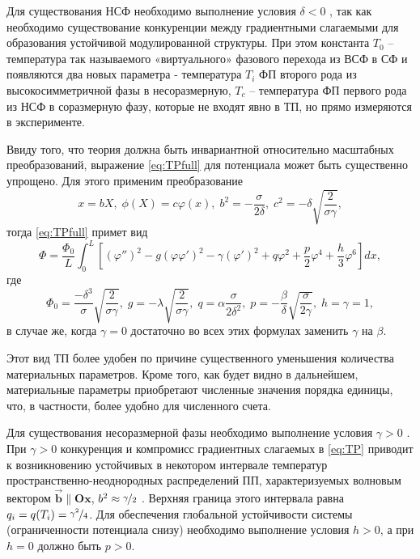 Для существования НСФ необходимо выполнение условия $\delta < 0$ \cite{Ishibashi1978}, так как необходимо существование конкуренции между градиентными слагаемыми для образования устойчивой модулированной структуры.
При этом константа $T_0$ -- температура так называемого «виртуального» фазового перехода из ВСФ в СФ и появляются два новых параметра - температура $T_i$ ФП второго рода из высокосимметричной фазы в несоразмерную, $T_c$ -- температура ФП первого рода из НСФ в соразмерную фазу, которые не входят явно в ТП, но прямо измеряются в эксперименте.

Ввиду того, что теория должна быть инвариантной относительно масштабных преобразований, выражение \eqref{eq:TPfull} для потенциала может быть существенно упрощено.
Для этого применим преобразование
\begin{equation}
x = bX, \; \phi(X) = c\varphi(x), \; b^2 = -\frac{\sigma}{2\delta}, \; c^2 = -\delta\sqrt{\frac{2}{\sigma\gamma}},
\label{eq:subst}
\end{equation}
тогда \eqref{eq:TPfull} примет вид
\begin{equation}
\Phi = \frac{\Phi_0}{L} \int_0^L \left[
            \left(\varphi''\right)^2 - g\left(\varphi\varphi'\right)^2 -
            \gamma\left(\varphi'\right)^2 +
            q\varphi^2 + \frac{p}{2}\varphi^4 + \frac{h}{3}\varphi^6
            \right] dx,
\label{eq:TP}
\end{equation}
где
\begin{equation}
\Phi_0 = \frac{-\delta^3}{\sigma}\sqrt{\frac{2}{\sigma\gamma}},\;
g = -\lambda\sqrt{\frac{2}{\sigma\gamma}},\;
q = \alpha\frac{\sigma}{2\delta^2},\;
p = -\frac{\beta}{\delta}\sqrt{\frac{\sigma}{2\gamma}},\;
h = \gamma = 1,
\label{eq:TPparts}
\end{equation}
в случае же, когда $\gamma=0$ достаточно во всех этих формулах заменить $\gamma$ на $\beta$.

Этот вид ТП более удобен по причине существенного уменьшения количества материальных параметров.
Кроме того, как будет видно в дальнейшем, материальные параметры приобретают численные значения порядка единицы, что, в частности, более удобно для численного счета.

Для существования несоразмерной фазы необходимо выполнение условия $\gamma>0$ \cite{Ishibashi1978}.
При $\gamma>0$ конкуренция и компромисс градиентных слагаемых в \eqref{eq:TP} приводит к возникновению устойчивых в некотором интервале температур пространственно-неоднородных распределений ПП, характеризуемых волновым вектором $\mathbf{\vec{b}} \| \mathbf{Ox}$, $b^2 \approx \nicefrac{\gamma}{2}$ \cite{Ishibashi1978}. Верхняя граница этого интервала равна \cite{Ishibashi1978} $q_i = q(T_i) = \nicefrac{\gamma^2}{4}$.
Для обеспечения глобальной устойчивости системы (ограниченности потенциала снизу) необходимо выполнение условия $h>0$, а при $h=0$ должно быть $p>0$.

